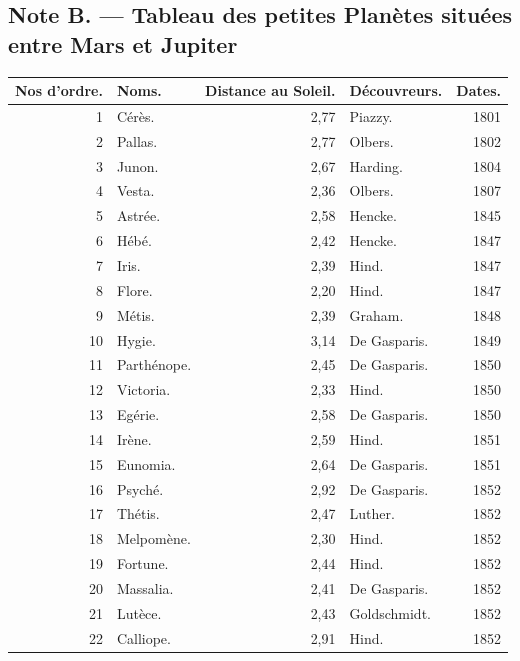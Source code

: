 \documentclass[a4paper, 11pt, oneside]{article}
\begin{document}
\subsection{Note B. --- Tableau des petites Planètes situées entre Mars et Jupiter}
\begin{center}
    \footnotesize
    \Fontauri
    \begin{longtable}{|r|l|r|l|r|}
    \hline
        \textbf{Nos d'ordre.} & \textbf{Noms.} & \textbf{Distance au Soleil.} & \textbf{Découvreurs.} & \textbf{Dates.} \\ \hline
        1 & Cérès. & 2,77 & Piazzy. & 1801 \\ \hline
        2 & Pallas. & 2,77 & Olbers. & 1802 \\ \hline
        3 & Junon. & 2,67 & Harding. & 1804 \\ \hline
        4 & Vesta. & 2,36 & Olbers. & 1807 \\ \hline
        5 & Astrée. & 2,58 & Hencke. & 1845 \\ \hline
        6 & Hébé. & 2,42 & Hencke. & 1847 \\ \hline
        7 & Iris. & 2,39 & Hind. & 1847 \\ \hline
        8 & Flore. & 2,20 & Hind. & 1847 \\ \hline
        9 & Métis. & 2,39 & Graham. & 1848 \\ \hline
        10 & Hygie. & 3,14 & De Gasparis. & 1849 \\ \hline
        11 & Parthénope. & 2,45 & De Gasparis. & 1850 \\ \hline
        12 & Victoria. & 2,33 & Hind. & 1850 \\ \hline
        13 & Egérie. & 2,58 & De Gasparis. & 1850 \\ \hline
        14 & Irène. & 2,59 & Hind. & 1851 \\ \hline
        15 & Eunomia. & 2,64 & De Gasparis. & 1851 \\ \hline
        16 & Psyché. & 2,92 & De Gasparis. & 1852 \\ \hline
        17 & Thétis. & 2,47 & Luther. & 1852 \\ \hline
        18 & Melpomène. & 2,30 & Hind. & 1852 \\ \hline
        19 & Fortune. & 2,44 & Hind. & 1852 \\ \hline
        20 & Massalia. & 2,41 & De Gasparis. & 1852 \\ \hline
        21 & Lutèce. & 2,43 & Goldschmidt. & 1852 \\ \hline
        22 & Calliope. & 2,91 & Hind. & 1852 \\ \hline

\end{longtable}
\end{center}
\end{document}

